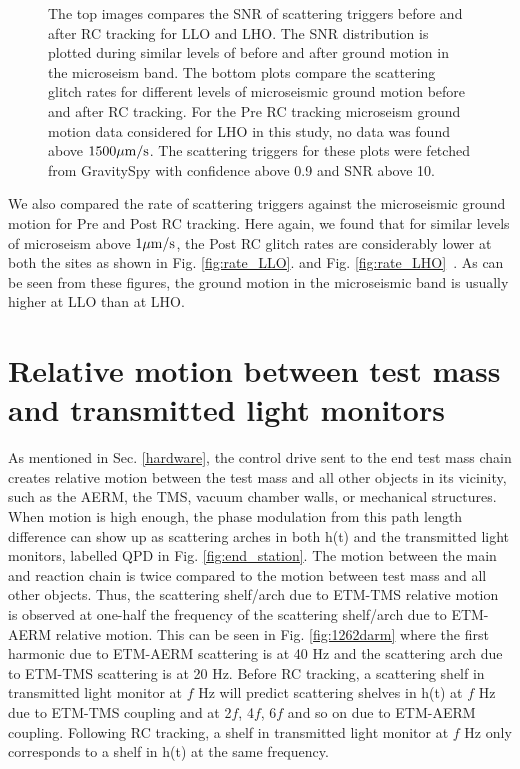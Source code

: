 \documentclass[12pt]{iopart}
\begin{document}
\begin{figure}[h]
    
    
    \caption{The top images compares the SNR of scattering triggers before and after RC tracking for LLO and LHO. The  SNR distribution is plotted during similar levels of before and after ground motion in the microseism band. The bottom plots compare the scattering glitch rates for different levels of microseismic ground motion before and after RC tracking. For the Pre RC tracking microseism ground motion data considered for LHO in this study, no data was found above $1500\mu{\rm m/s}$. The scattering triggers for these plots were fetched from GravitySpy with confidence above 0.9 and SNR above 10.} 
    \label{fig:postr0_scat}
    
\end{figure}
We also compared the rate of scattering triggers against the microseismic ground motion for Pre and Post RC tracking. Here again, we found that for similar levels of microseism above $1\mu{\rm m/s}$, the Post RC glitch rates are considerably lower at both the sites as shown in Fig. \ref{fig:rate_LLO}. and Fig. \ref{fig:rate_LHO}~\cite{alog_corey}. As can be seen from these figures, the ground motion in the microseismic band is usually higher at LLO than at LHO.

\section{Relative motion between test mass and transmitted light monitors} \label{transmon_scattering}
As mentioned in Sec. \ref{hardware}, the control drive sent to the end test mass chain creates relative motion between the test mass and all other objects in its vicinity, such as the AERM, the TMS, vacuum chamber walls, or mechanical structures. When motion is high enough, the phase modulation from this path length difference can show up as scattering arches in both h(t) and the transmitted light monitors, labelled QPD in Fig. \ref{fig:end_station}. The motion between the main and reaction chain is twice compared to the motion between test mass and all other objects. Thus, the scattering shelf/arch due to ETM-TMS relative motion is observed at one-half the frequency of the scattering shelf/arch due to ETM-AERM relative motion. This can be seen in Fig. \ref{fig:1262darm} where the first harmonic due to ETM-AERM scattering is at 40 Hz and the scattering arch due to ETM-TMS scattering is at 20 Hz. Before RC tracking, a scattering shelf in transmitted light monitor at $f$ Hz will predict scattering shelves in h(t) at $f$ Hz due to ETM-TMS coupling and at 2$f$, 4$f$, 6$f$ and so on due to ETM-AERM coupling. Following RC tracking, a shelf in transmitted light monitor at $f$ Hz only corresponds to a shelf in h(t) at the same frequency.
\par
 
\end{document}
